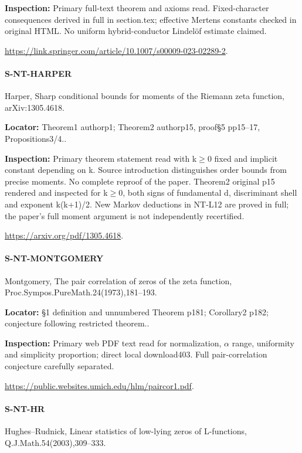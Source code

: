 \documentclass[11pt,a4paper]{article}
\begin{document}
\textbf{Inspection:} Primary full-text theorem and axioms read.\allowbreak{} Fixed-character consequences derived in full in section.\allowbreak{}tex; effective Mertens constants checked in original HTML.\allowbreak{} No uniform hybrid-conductor Lindelöf estimate claimed.\allowbreak{}

\url{https://link.springer.com/article/10.1007/s00009-023-02289-2}.

\paragraph{S-NT-HARPER} Harper, Sharp conditional bounds for moments of the Riemann zeta function, arXiv:\allowbreak{}1305.\allowbreak{}4618.

\textbf{Locator:} Theorem1 authorp1; Theorem2 authorp15, proof§5 pp15–\allowbreak{}17, Propositions3/\allowbreak{}4.\allowbreak{}.

\textbf{Inspection:} Primary theorem statement read with k\ensuremath{\ge}0 fixed and implicit constant depending on k.\allowbreak{} Source introduction distinguishes order bounds from precise moments.\allowbreak{} No complete reproof of the paper.\allowbreak{} Theorem2 original p15 rendered and inspected for k\ensuremath{\ge}0, both signs of fundamental d, discriminant shell and exponent k(k+1)/\allowbreak{}2.\allowbreak{} New Markov deductions in NT-L12 are proved in full; the paper’s full moment argument is not independently recertified.\allowbreak{}

\url{https://arxiv.org/pdf/1305.4618}.

\paragraph{S-NT-MONTGOMERY} Montgomery, The pair correlation of zeros of the zeta function, Proc.\allowbreak{}Sympos.\allowbreak{}PureMath.\allowbreak{}24(1973),181–\allowbreak{}193.

\textbf{Locator:} §1 definition and unnumbered Theorem p181; Corollary2 p182; conjecture following restricted theorem.\allowbreak{}.

\textbf{Inspection:} Primary web PDF text read for normalization, \ensuremath{\alpha} range, uniformity and simplicity proportion; direct local download403.\allowbreak{} Full pair-correlation conjecture carefully separated.\allowbreak{}

\url{https://public.websites.umich.edu/hlm/paircor1.pdf}.

\paragraph{S-NT-HR} Hughes–\allowbreak{}Rudnick, Linear statistics of low-lying zeros of L-functions, Q.\allowbreak{}J.\allowbreak{}Math.\allowbreak{}54(2003),309–\allowbreak{}333.
\end{document}
